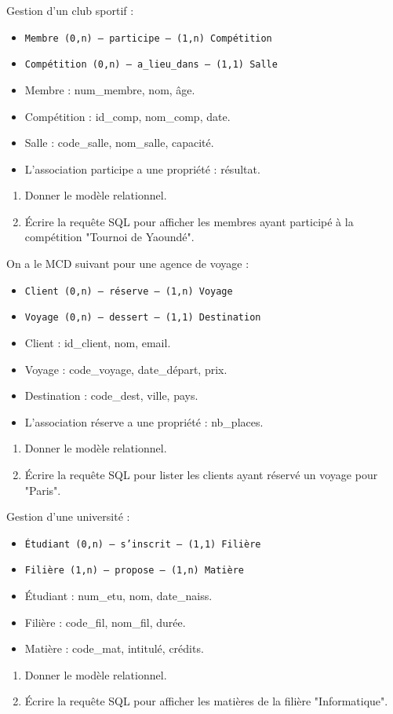 \exo{}
Gestion d'un club sportif :
\begin{itemize}
    \item \texttt{Membre (0,n) --- participe --- (1,n) Compétition}
    \item \texttt{Compétition (0,n) --- a\_lieu\_dans --- (1,1) Salle}
    \item Membre : num\_membre, nom, âge.
    \item Compétition : id\_comp, nom\_comp, date.
    \item Salle : code\_salle, nom\_salle, capacité.
    \item L'association participe a une propriété : résultat.
\end{itemize}
\begin{enumerate}
    \item Donner le modèle relationnel.
    \item Écrire la requête SQL pour afficher les membres ayant participé à la compétition "Tournoi de Yaoundé".
\end{enumerate}


\exo{}
On a le MCD suivant pour une agence de voyage :
\begin{itemize}
    \item \texttt{Client (0,n) --- réserve --- (1,n) Voyage}
    \item \texttt{Voyage (0,n) --- dessert --- (1,1) Destination}
    \item Client : id\_client, nom, email.
    \item Voyage : code\_voyage, date\_départ, prix.
    \item Destination : code\_dest, ville, pays.
    \item L'association réserve a une propriété : nb\_places.
\end{itemize}
\begin{enumerate}
    \item Donner le modèle relationnel.
    \item Écrire la requête SQL pour lister les clients ayant réservé un voyage pour "Paris".
\end{enumerate}

\exo{}
Gestion d'une université :
\begin{itemize}
    \item \texttt{Étudiant (0,n) --- s'inscrit --- (1,1) Filière}
    \item \texttt{Filière (1,n) --- propose --- (1,n) Matière}
    \item Étudiant : num\_etu, nom, date\_naiss.
    \item Filière : code\_fil, nom\_fil, durée.
    \item Matière : code\_mat, intitulé, crédits.
\end{itemize}
\begin{enumerate}
    \item Donner le modèle relationnel.
    \item Écrire la requête SQL pour afficher les matières de la filière "Informatique".
\end{enumerate}

